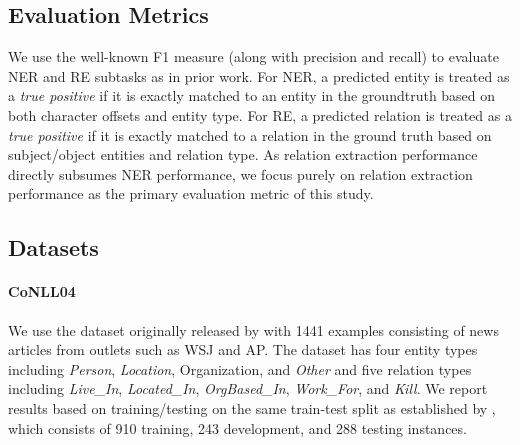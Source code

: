 \documentclass{clv3}
\begin{document}
\subsection{Evaluation Metrics}

We use the well-known F1 measure (along with precision and recall) to evaluate NER and RE subtasks as in prior work. For NER, a predicted entity is treated as a \emph{true positive} if it is exactly matched to an entity in the groundtruth based on both character offsets and entity type. For RE, a predicted relation is treated as a \emph{true positive} if it is exactly matched to a relation in the ground truth based on subject/object entities and relation type. As relation extraction performance directly subsumes NER performance, we focus purely on relation extraction performance as the primary evaluation metric of this study.

\subsection{Datasets}



\paragraph{CoNLL04} We use the dataset originally released by  with 1441 examples consisting of news articles from outlets such as WSJ and AP. The dataset has four entity types including \emph{Person}, \emph{Location}, {Organization}, and \emph{Other} and five relation types including \emph{Live\_In}, \emph{Located\_In}, \emph{OrgBased\_In}, \emph{Work\_For}, and \emph{Kill}. We report results based on training/testing on the same train-test split as established by , which consists of 910 training, 243 development, and 288 testing instances.
\end{document}
